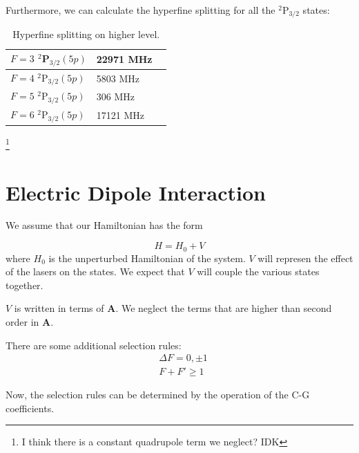 Furthermore, we can calculate the hyperfine splitting for all the $^2$P$_{3/2}$ states: 


\begin{table}[h]
\centering
\begin{tabular}{|l|l|||r|}
\hline
$F=3$ $^2$P$_{3/2} (5p)$ & 22971  MHz\\ \hline
$F=4$ $^2$P$_{3/2} (5p)$ &  5803 MHz\\ \hline
$F=5$ $^2$P$_{3/2} (5p)$ &  306 MHz\\ \hline
$F=6$ $^2$P$_{3/2} (5p)$ &   17121 MHz\\ \hline
\end{tabular}
\caption{Hyperfine splitting on higher level.}
\label{tableOfHyperfine deetuings}
\end{table}


\footnote{I think there is a constant quadrupole term we neglect? IDK}


\section{Electric Dipole Interaction}

We assume that our Hamiltonian has the form 

\begin{equation}
H=H_0+V
\end{equation}
where $H_0$ is the unperturbed Hamiltonian of the system. $V$ will represen the effect of the lasers on the states. We expect that $V$ will couple the various states together. 

$V$ is written in terms of $\mathbf{A}$. We neglect the terms that are higher than second order in $\mathbf{A}$.




There are some additional selection rules\cite{sobelman_spectra}:
\begin{align}
&\Delta F=0,\pm 1\\
&F+F'\geq 1
\end{align}

Now, the selection rules can be determined by the operation of the C-G coefficients. 

